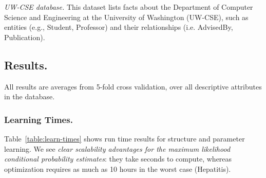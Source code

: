 \documentclass{article}
\begin{document}


\emph{UW-CSE database.} This dataset lists facts about the Department of Computer Science and Engineering at the University of Washington (UW-CSE), such as entities (e.g., Student, Professor) and their relationships (i.e. AdvisedBy, Publication).


\subsection{Results.}

All results are averages from 5-fold cross validation, over all descriptive attributes in the database. 

\subsubsection{Learning Times.}
Table~\ref{table:learn-times} shows run time results for structure and parameter learning. We see {\em clear scalability advantages for the maximum likelihood conditional probability estimates}: they take seconds to compute, whereas optimization requires as much as 10 hours in the worst case (Hepatitis). 
\end{document}
